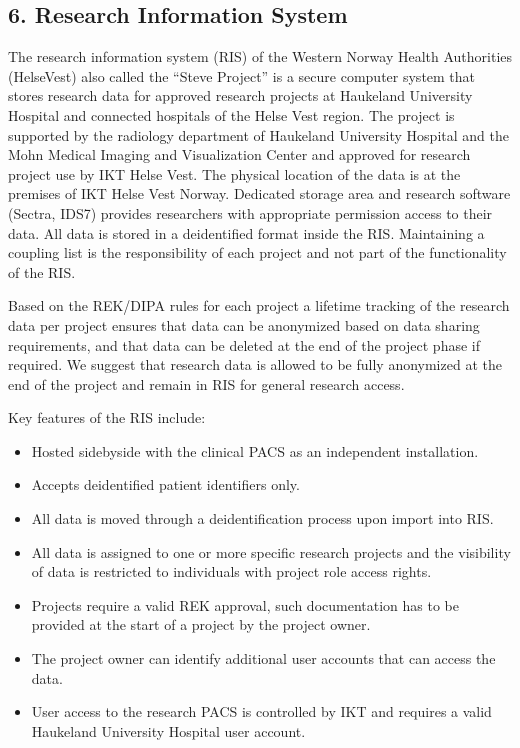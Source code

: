 \documentclass[letterpaper,10pt,english]{sphinxmanual}
\begin{document}
\subsection{6. Research Information System}
\label{\detokenize{EndUser/end-user:research-information-system}}
\sphinxAtStartPar
The research information system (RIS) of the Western Norway Health Authorities (Helse\sphinxhyphen{}Vest) also called the “Steve Project” is a secure computer system that stores research data for approved research projects at Haukeland University Hospital and connected hospitals of the Helse Vest region. The project is supported by the radiology department of Haukeland University Hospital and the Mohn Medical Imaging and Visualization Center and approved for research project use by IKT Helse Vest. The physical location of the data is at the premises of IKT Helse Vest Norway. Dedicated storage area and research software (Sectra, IDS7) provides researchers with appropriate permission access to their data. All data is stored in a de\sphinxhyphen{}identified format inside the RIS. Maintaining a coupling list is the responsibility of each project and not part of the functionality of the RIS.

\sphinxAtStartPar
Based on the REK/DIPA rules for each project a lifetime tracking of the research data per project ensures that data can be anonymized based on data sharing requirements, and that data can be deleted at the end of the project phase \sphinxhyphen{} if required. We suggest that research data is allowed to be fully anonymized at the end of the project and remain in RIS for general research access.

\sphinxAtStartPar
Key features of the RIS include:
\begin{itemize}
\item {} 
\sphinxAtStartPar
Hosted side\sphinxhyphen{}by\sphinxhyphen{}side with the clinical PACS as an independent installation.

\item {} 
\sphinxAtStartPar
Accepts de\sphinxhyphen{}identified patient identifiers only.

\item {} 
\sphinxAtStartPar
All data is moved through a de\sphinxhyphen{}identification process upon import into RIS.

\item {} 
\sphinxAtStartPar
All data is assigned to one or more specific research projects and the visibility of data is restricted to individuals with project role access rights.

\item {} 
\sphinxAtStartPar
Projects require a valid REK approval, such documentation has to be provided at the start of a project by the project owner.

\item {} 
\sphinxAtStartPar
The project owner can identify additional user accounts that can access the data.

\item {} 
\sphinxAtStartPar
User access to the research PACS is controlled by IKT and requires a valid Haukeland University Hospital user account.

\end{itemize}
\end{document}
